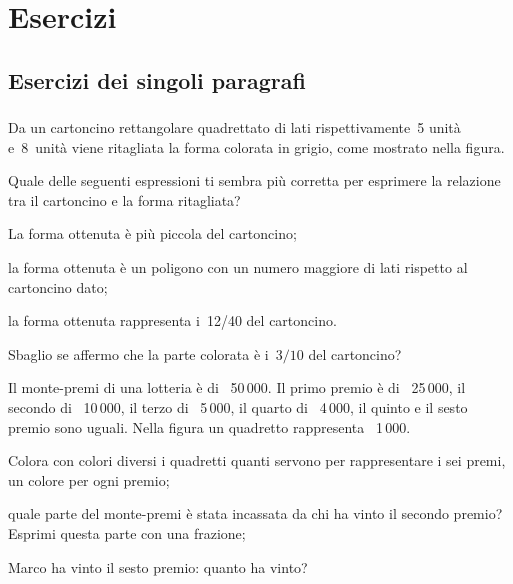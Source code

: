 
\section{Esercizi}

\subsection{Esercizi dei singoli paragrafi}

\subsubsection*{}

\begin{esercizio}
\label{ese:3.1}
Da un cartoncino rettangolare quadrettato di lati rispettivamente~5 unità 
e~8~unità viene ritagliata la forma colorata in grigio, come mostrato nella 
figura.
\begin{center}
 
\end{center}
Quale delle seguenti espressioni ti sembra più corretta per esprimere la 
relazione tra il cartoncino e la forma ritagliata?
\begin{enumeratea}
 \item La forma ottenuta è più piccola del cartoncino;
 \item la forma ottenuta è un poligono con un numero maggiore di lati rispetto 
 al cartoncino dato;  
 \item la forma ottenuta rappresenta i~12/40 del cartoncino.
\end{enumeratea}
Sbaglio se affermo che la parte colorata è i~\(3/10\) del cartoncino?
\end{esercizio}

\begin{esercizio}
\label{ese:3.2}
Il monte-premi di una lotteria è di \officialeuro\ 50\,000. 
Il primo premio è di \officialeuro\ 25\,000, 
il secondo di \officialeuro\ 10\,000, 
il terzo di \officialeuro\ 5\,000, 
il quarto di \officialeuro\ 4\,000, 
il quinto e il sesto premio sono uguali.
Nella figura un quadretto rappresenta \officialeuro\ 1\,000.
\begin{center}
 
\end{center}
\begin{enumeratea}
 \item Colora con colori diversi i quadretti quanti servono per rappresentare 
 i sei premi, un colore per ogni premio;
 \item quale parte del monte-premi è stata incassata da chi ha vinto 
 il secondo premio? Esprimi questa parte con una frazione;
 \item Marco ha vinto il sesto premio: quanto ha vinto?
\end{enumeratea}
\end{esercizio}

